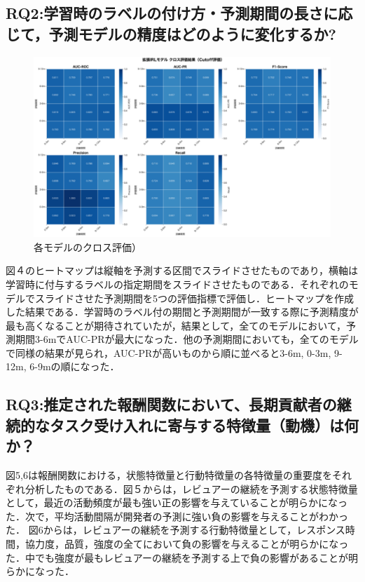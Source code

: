 \documentclass[submit,techrep,noauthor]{ipsj}
\begin{document}
\subsection{RQ2:学習時のラベルの付け方・予測期間の長さに応じて，予測モデルの精度はどのように変化するか?}
\begin{figure}[t]
    \centering
\includegraphics[width=1.0\textwidth]{./Hashimoto_fig/heatmap.pdf}
    \caption{各モデルのクロス評価）}
    \label{fig:result}
\end{figure}
図４のヒートマップは縦軸を予測する区間でスライドさせたものであり，横軸は学習時に付与するラベルの指定期間をスライドさせたものである．それぞれのモデルでスライドさせた予測期間を5つの評価指標で評価し．ヒートマップを作成した結果である．学習時のラベル付の期間と予測期間が一致する際に予測精度が最も高くなることが期待されていたが，結果として，全てのモデルにおいて，予測期間3-6mでAUC-PRが最大になった．他の予測期間においても，全てのモデルで同様の結果が見られ，AUC-PRが高いものから順に並べると3-6m, 0-3m, 9-12m, 6-9mの順になった．


\subsection{RQ3:推定された報酬関数において、長期貢献者の継続的なタスク受け入れに寄与する特徴量（動機）は何か？}
図5,6は報酬関数における，状態特徴量と行動特徴量の各特徴量の重要度をそれぞれ分析したものである．図５からは，レビュアーの継続を予測する状態特徴量として，最近の活動頻度が最も強い正の影響を与えていることが明らかになった．次で，平均活動間隔が開発者の予測に強い負の影響を与えることがわかった．
図6からは，レビュアーの継続を予測する行動特徴量として，レスポンス時間，協力度，品質，強度の全てにおいて負の影響を与えることが明らかになった．中でも強度が最もレビュアーの継続を予測する上で負の影響があることが明らかになった．
\end{document}
